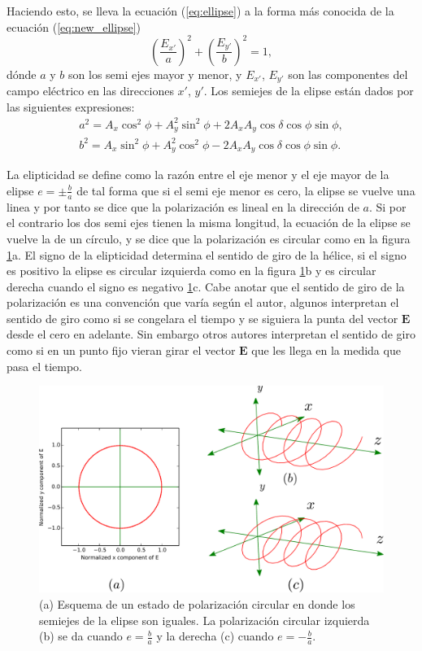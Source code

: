 Haciendo esto, se lleva la
ecuación (\ref{eq:ellipse}) a la forma más conocida de la ecuación
(\ref{eq:new_ellipse})
\begin{equation}
\left(\frac{E_{x'}}{a}\right)^2+\left(\frac{E_{y'}}{b}\right)^2 = 1,
\label{eq:new_ellipse}
\end{equation}
dónde $a$ y $b$ son los semi ejes mayor y menor, y $E_{x'}$, $E_{y'}$
son las componentes del campo eléctrico en las direcciones $x'$,
$y'$. Los semiejes de la elipse están dados por las siguientes expresiones:
\begin{align*}
a^2 = A_x\cos^2{\phi}+A_y^2\sin^2{\phi} +2A_xA_y \cos{\delta}\cos{\phi}\sin{\phi},\\
b^2 = A_x\sin^2{\phi}+A_y^2\cos^2{\phi} -2A_xA_y \cos{\delta}\cos{\phi}\sin{\phi}.
\end{align*}

La elipticidad se define como la razón entre el eje menor y el eje
mayor de la elipse $e=\pm\frac{b}{a}$ de tal forma que si el semi eje
menor es cero, la elipse se vuelve una linea y por tanto se dice que
la polarización es lineal en la dirección de $a$. Si por el contrario
los dos semi ejes tienen  la misma longitud, la ecuación de la elipse
se vuelve la de un círculo, y se dice que la polarización es
circular como en la figura \ref{fig:circular_polarizations}a. 
El signo de la elipticidad determina el sentido
de giro de la hélice, si el signo es positivo la elipse es circular
izquierda como en la figura \ref{fig:circular_polarizations}b y es circular derecha
cuando el signo es negativo \ref{fig:circular_polarizations}c. Cabe
anotar que el sentido de giro de la polarización es una convención
que varía según el autor, algunos interpretan el sentido de giro como
si se congelara el tiempo y se siguiera la punta del vector
$\mathbf{E}$ desde el cero en adelante. Sin embargo otros autores
interpretan el sentido de giro como si en un punto fijo vieran girar
el vector $\mathbf{E}$ que les llega en la medida que pasa el tiempo. 

\begin{figure}[h!]
\centering
\includegraphics[scale=.5]{circular_polarizations}
\caption[Estados de polarización circular]{(a) Esquema de un estado de polarización circular en donde los semiejes
  de la elipse son iguales. La polarización circular izquierda (b) se da
cuando $e=\frac{b}{a}$ y la derecha (c) cuando  $e=-\frac{b}{a}$.}
\label{fig:circular_polarizations}
\end{figure}

